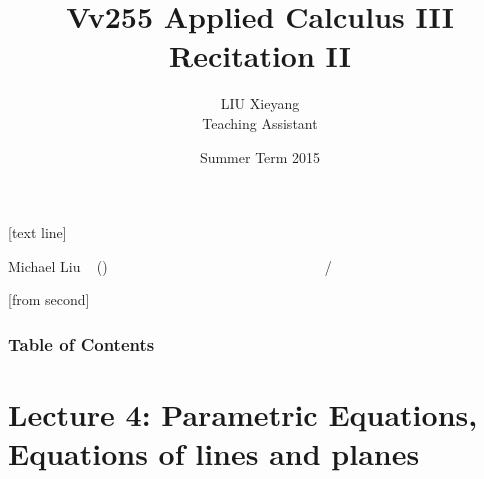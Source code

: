 \documentclass{beamer}
\begin{document}



[text line]{%
	\color{blue!40!black}\parbox{\linewidth}{\vspace*{-8pt}Michael Liu ~ (\insertshortinstitute)~~~~~~~~~~~~~~~~~~~~~~~~\insertshorttitle\hfill\insertshortdate~~~~~~\insertframenumber{}~/~\inserttotalframenumber}}


[from second] 

\newcommand{\tabincell}[2]{\begin{tabular}{@{}#1@{}}#2\end{tabular}}


\title[Vv255 Applied Calculus III]{Vv255 Applied Calculus III\\{\small Recitation II}}   
\author[Michael Liu]{LIU Xieyang\\{\tiny Teaching Assistant}} 
\date[Summer 2015]{Summer Term 2015} 
\begin{frame}
	\titlepage
\end{frame}

\begin{frame}
	\frametitle{Table of Contents}
	\tableofcontents
\end{frame}





\section{Lecture 4: Parametric Equations, Equations of lines and planes} 
\end{document}

